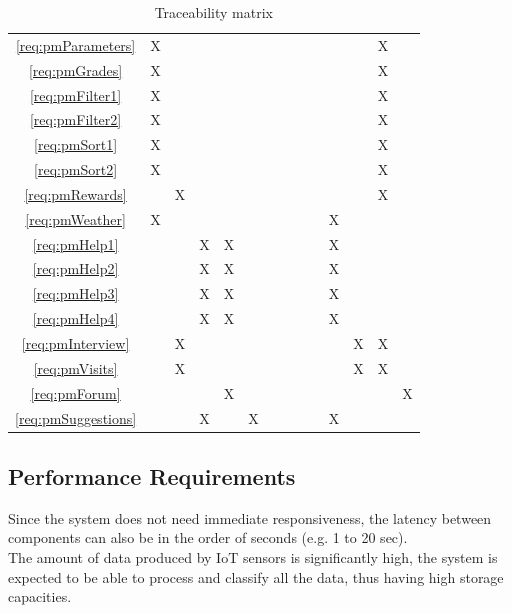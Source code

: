 \documentclass[10pt]{article}
\begin{document}
\begin{table}[h!]
\begin{center}
\begin{adjustbox}{width=\columnwidth,center}
\begin{tabular}{|c|ccccc|cccccccc|}
    \ref{req:pmParameters}  & X &  &  &  &  &  &  &  &  &  &  & X &  \\
    \ref{req:pmGrades}  & X &  &  &  &  &  &  &  &  &  &  & X &  \\
    \ref{req:pmFilter1}  & X &  &  &  &  &  &  &  &  &  &  & X &  \\
    \ref{req:pmFilter2}  & X &  &  &  &  &  &  &  &  &  &  & X &  \\
    \ref{req:pmSort1}  & X &  &  &  &  &  &  &  &  &  &  & X &  \\
    \ref{req:pmSort2}  & X &  &  &  &  &  &  &  &  &  &  & X &  \\
    \ref{req:pmRewards}  &  & X &  &  &  &  &  &  &  &  &  & X &  \\
    \ref{req:pmWeather}  & X &  &  &  &  &  &  &  &  & X &  &  &  \\
    \ref{req:pmHelp1}  &  &  & X & X &  &  &  &  &  & X &  &  &  \\
    \ref{req:pmHelp2}  &  &  & X & X &  &  &  &  &  & X &  &  &  \\
    \ref{req:pmHelp3}  &  &  & X & X &  &  &  &  &  & X &  &  &  \\
    \ref{req:pmHelp4}  &  &  & X & X &  &  &  &  &  & X &  &  &  \\
    \ref{req:pmInterview}  &  & X &  &  &  &  &  &  &  &  & X & X &  \\
    \ref{req:pmVisits}  &  & X &  &  &  &  &  &  &  &  & X & X &  \\
    \ref{req:pmForum}  &  &  &  & X &  &  &  &  &  &  &  &  & X \\
    \ref{req:pmSuggestions}  &  &  & X &  & X &  &  &  &  & X &  &  &  \\
    \hline
    \end{tabular}
    \end{adjustbox}
    \end{center}
    \caption{Traceability matrix}
\end{table}
\newpage
\subsection{Performance Requirements}
Since the system does not need immediate responsiveness, the latency between components can also be in the order of seconds (e.g. 1 to 20 sec).\\
The amount of data produced by IoT sensors is significantly high, the system is expected to be able to process and classify all the data, thus having high storage capacities.\\
\end{document}
